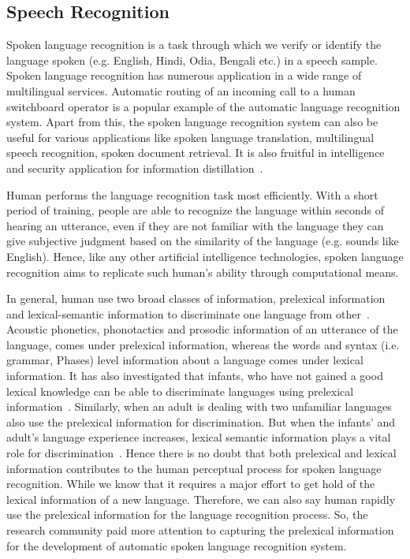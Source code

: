 \begin{spacing}{1.5}
\section{Speech Recognition}
Spoken language recognition is a task through which we verify or identify the
language spoken (e.g. English, Hindi, Odia, Bengali etc.) in a speech sample. Spoken language recognition has numerous application in a wide range of multilingual services. Automatic routing of an incoming call to a human switchboard operator is a popular example of the automatic language recognition system. Apart from this, the spoken language recognition system can also be useful for various applications like spoken language translation, multilingual speech recognition, spoken document retrieval. It is also fruitful in intelligence and security application for information distillation~\cite{li2013spoken}. 

Human performs the language recognition task most efficiently. With a short period of training, people are able to recognize the language within seconds of hearing an utterance, even if they are not familiar with the language they can give subjective judgment based on the similarity of the language (e.g. sounds like English). Hence, like any other artificial intelligence technologies, spoken language recognition aims to replicate such human's ability through computational means.

In general, human use two broad classes of information, prelexical information and lexical-semantic information to discriminate one language from other~\cite{zhao2008cortical}. Acoustic phonetics, phonotactics and prosodic information of an utterance of the language, comes under prelexical information, whereas the words and syntax (i.e. grammar, Phases) level information about a language comes under lexical information. It has also investigated that infants, who have not gained a good lexical knowledge can be able to discriminate languages using prelexical information~\cite{ramus1999language}. Similarly, when an adult is dealing with two unfamiliar languages also use the prelexical information for discrimination. But when the infants' and adult's language experience increases, lexical semantic information plays a vital role for discrimination~\cite{zhao2008cortical}. Hence there is no doubt that both prelexical and lexical information contributes to the human perceptual process for spoken language recognition. While we know that it requires a major effort to get hold of the lexical information of a new language. Therefore, we can also say human rapidly use the prelexical information for the language recognition process. So, the research community paid more attention to capturing the prelexical information for the development of automatic spoken language recognition system.


\end{spacing}
